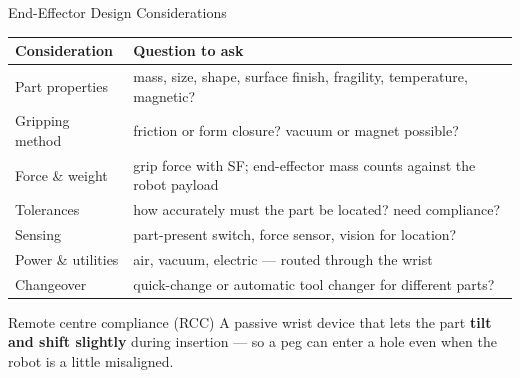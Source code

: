 \documentclass[aspectratio=169]{beamer}
\begin{document}
	\begin{frame}{End-Effector Design Considerations}
		\renewcommand{\arraystretch}{1.1}
		\centering
		\footnotesize
		\begin{tabular}{@{}>{\raggedright}p{3.4cm}>{\raggedright\arraybackslash}p{9.2cm}@{}}
			\toprule
			\textbf{Consideration} & \textbf{Question to ask} \\
			\midrule
			Part properties   & mass, size, shape, surface finish, fragility, temperature, magnetic? \\
			Gripping method   & friction or form closure? vacuum or magnet possible? \\
			Force \& weight   & grip force with SF; end-effector mass counts against the robot payload \\
			Tolerances        & how accurately must the part be located? need compliance? \\
			Sensing           & part-present switch, force sensor, vision for location? \\
			Power \& utilities & air, vacuum, electric --- routed through the wrist \\
			Changeover        & quick-change or automatic tool changer for different parts? \\
			\bottomrule
		\end{tabular}
		\vspace{0.15cm}
		\begin{block}{Remote centre compliance (RCC)}
			\small A passive wrist device that lets the part \textbf{tilt and shift slightly} during insertion --- so a peg can enter a hole even when the robot is a little misaligned.
		\end{block}
	\end{frame}

\end{document}

